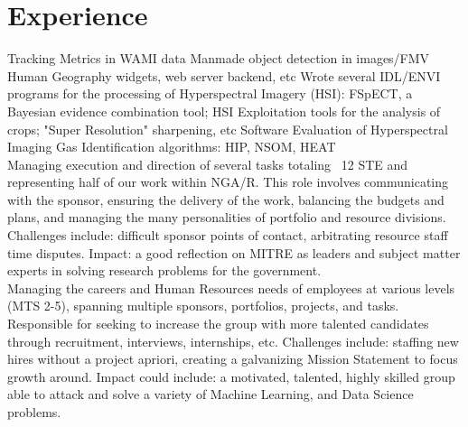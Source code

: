 \documentclass[letterpaper]{deedy-resume} %
\begin{document}
\begin{minipage}[t]{0.69\textwidth} %


\section{Experience}


Tracking Metrics in WAMI data
Manmade object detection in images/FMV
Human Geography widgets, web server backend, etc
Wrote several IDL/ENVI programs for the processing of Hyperspectral Imagery (HSI): FSpECT, a Bayesian evidence combination tool;  HSI Exploitation tools for the analysis of crops; "Super Resolution" sharpening, etc
Software Evaluation of Hyperspectral Imaging Gas Identification algorithms: HIP, NSOM, HEAT \\
Managing execution and direction of several tasks totaling ~12 STE and representing half of our work within NGA/R.  This role involves communicating with the sponsor, ensuring the delivery of the work, balancing the budgets and plans, and managing the many personalities of portfolio and resource divisions.  Challenges include: difficult sponsor points of contact, arbitrating resource staff time disputes.  Impact: a good reflection on MITRE as leaders and subject matter experts in solving research problems for the government.\\
Managing the careers and Human Resources needs of employees at various levels (MTS 2-5), spanning multiple sponsors, portfolios, projects, and tasks.  Responsible for seeking to increase the group with more talented candidates through recruitment, interviews, internships, etc.  Challenges include: staffing new hires without a project apriori, creating a galvanizing Mission Statement to focus growth around.  Impact could include: a motivated, talented, highly skilled group able to attack and solve a variety of Machine Learning, and Data Science problems.\\


\end{minipage}
\end{document}
